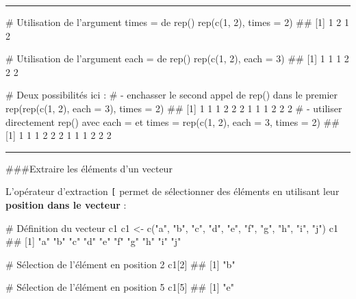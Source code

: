 \documentclass[12pt,twosided, notitlepage]{book}
\newenvironment{Shaded}{}{}
\newcommand{\CommentTok}[1]{\textcolor[rgb]{0.00,0.50,0.00}{#1}}
\newcommand{\DataTypeTok}[1]{#1}
\newcommand{\DecValTok}[1]{#1}
\newcommand{\KeywordTok}[1]{\textcolor[rgb]{0.00,0.00,1.00}{#1}}
\newcommand{\NormalTok}[1]{#1}
\newcommand{\StringTok}[1]{\textcolor[rgb]{0.00,0.50,0.50}{#1}}
\renewenvironment{Shaded}{\begin{snugshade}}{\end{snugshade}}
\begin{document}
\begin{enumerate}
  \begin{center} \rule{0.5\linewidth}{\linethickness}\end{center}

\begin{Shaded}
\begin{Highlighting}[]
\CommentTok{# Utilisation de l'argument times = de rep()}
\KeywordTok{rep}\NormalTok{(}\KeywordTok{c}\NormalTok{(}\DecValTok{1}\NormalTok{, }\DecValTok{2}\NormalTok{), }\DataTypeTok{times =} \DecValTok{2}\NormalTok{)}
\NormalTok{  ## [1] 1 2 1 2}

\CommentTok{# Utilisation de l'argument each = de rep()}
\KeywordTok{rep}\NormalTok{(}\KeywordTok{c}\NormalTok{(}\DecValTok{1}\NormalTok{, }\DecValTok{2}\NormalTok{), }\DataTypeTok{each =} \DecValTok{3}\NormalTok{)}
\NormalTok{  ## [1] 1 1 1 2 2 2}

\CommentTok{# Deux possibilités ici : }
\CommentTok{# - enchasser le second appel de rep() dans le premier}
\KeywordTok{rep}\NormalTok{(}\KeywordTok{rep}\NormalTok{(}\KeywordTok{c}\NormalTok{(}\DecValTok{1}\NormalTok{, }\DecValTok{2}\NormalTok{), }\DataTypeTok{each =} \DecValTok{3}\NormalTok{), }\DataTypeTok{times =} \DecValTok{2}\NormalTok{)}
\NormalTok{  ##  [1] 1 1 1 2 2 2 1 1 1 2 2 2}
\CommentTok{# - utiliser directement rep() avec each = et times =}
\KeywordTok{rep}\NormalTok{(}\KeywordTok{c}\NormalTok{(}\DecValTok{1}\NormalTok{, }\DecValTok{2}\NormalTok{), }\DataTypeTok{each =} \DecValTok{3}\NormalTok{, }\DataTypeTok{times =} \DecValTok{2}\NormalTok{)}
\NormalTok{  ##  [1] 1 1 1 2 2 2 1 1 1 2 2 2}
\end{Highlighting}
\end{Shaded}

  \begin{center} \rule{0.5\linewidth}{\linethickness}\end{center} 
    \bigskip 
    \fi
\end{enumerate}

\#\#\#Extraire les éléments d'un vecteur

L'opérateur d'extraction \texttt{{[}} permet de sélectionner des
éléments en utilisant leur \textbf{position dans le vecteur} :

\begin{Shaded}
\begin{Highlighting}[]
\CommentTok{# Définition du vecteur c1}
\NormalTok{c1 <-}\StringTok{ }\KeywordTok{c}\NormalTok{(}\StringTok{"a"}\NormalTok{, }\StringTok{"b"}\NormalTok{, }\StringTok{"c"}\NormalTok{, }\StringTok{"d"}\NormalTok{, }\StringTok{"e"}\NormalTok{, }\StringTok{"f"}\NormalTok{, }\StringTok{"g"}\NormalTok{, }\StringTok{"h"}\NormalTok{, }\StringTok{"i"}\NormalTok{, }\StringTok{"j"}\NormalTok{)}
\NormalTok{c1}
\NormalTok{  ##  [1] "a" "b" "c" "d" "e" "f" "g" "h" "i" "j"}

\CommentTok{# Sélection de l'élément en position 2}
\NormalTok{c1[}\DecValTok{2}\NormalTok{]}
\NormalTok{  ## [1] "b"}

\CommentTok{# Sélection de l'élément en position 5}
\NormalTok{c1[}\DecValTok{5}\NormalTok{]}
\NormalTok{  ## [1] "e"}
\end{Highlighting}
\end{Shaded}
\end{document}
